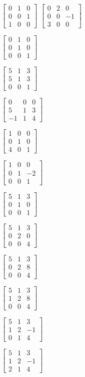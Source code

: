 \documentclass[minion]{homework}
\def\trmat#1#2#3|#4#5#6|#7#8#9{\begin{bmatrix}#1&#2&#3\\#4&#5&#6\\#7&#8&#9\end{bmatrix}}
\begin{document}
\begin{aproblems}
\aproblem \qquad $\displaystyle\trmat010|001|100$
\newpage
\aproblem \qquad $\displaystyle\trmat020|00{-1}|300$

\aproblem \qquad $\displaystyle\trmat010|010|001$

\aproblem \qquad $\displaystyle\trmat513|513|001$

\aproblem \qquad $\displaystyle\trmat000|513|{-1}14$

\aproblem \qquad $\displaystyle\trmat100|010|401$

\aproblem \qquad $\displaystyle\trmat100|01{-2}|001$

\aproblem \qquad $\displaystyle\trmat513|010|001$

\aproblem \qquad $\displaystyle\trmat513|020|004$

\aproblem \qquad $\displaystyle\trmat513|028|004$

\aproblem \qquad $\displaystyle\trmat513|12{8}|004$

\aproblem \qquad $\displaystyle\trmat513|12{-1}|014$

\aproblem \qquad $\displaystyle\trmat513|12{-1}|214$

\end{aproblems}
\end{document}
